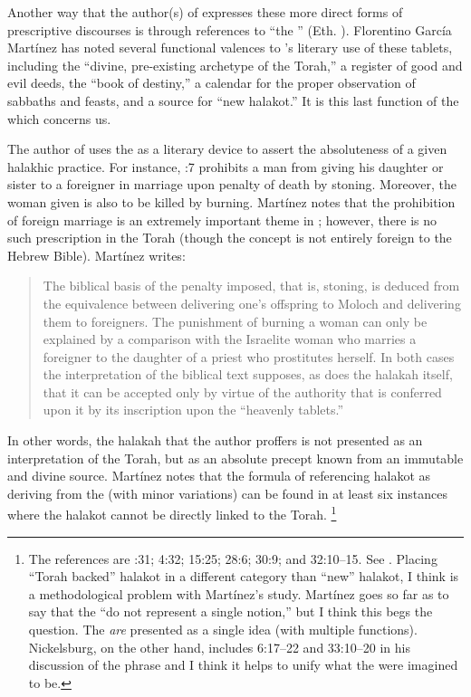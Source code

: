 Another way that the author(s) of \jub expresses these more direct forms of prescriptive discourses is through references to ``the \heavenlytablets'' (Eth. ). Florentino García Martínez has noted several functional valences to \jub's literary use of these tablets, including  the ``divine, pre-existing archetype of the Torah,'' a register of good and evil deeds, the ``book of destiny,'' a calendar for the proper observation of sabbaths and feasts, and a source for ``new halakot.''%
    \autocite{martinez_najman-tigchelaar2012}
It is this last function of the \heavenlytablets which concerns us.

The author of \jub uses the \heavenlytablets as a literary device to assert the absoluteness of a given halakhic practice. For instance, :7 prohibits a man from giving his daughter or sister to a foreigner in marriage upon penalty of death by stoning. Moreover, the woman given is also to be killed by burning. Martínez notes that the prohibition of foreign marriage is an extremely important theme in \jub; however, there is no such prescription in the Torah (though the concept is not entirely foreign to the Hebrew Bible). Martínez writes:
\begin{quote}
    The biblical basis of the penalty imposed, that is, stoning, is deduced from the equivalence between delivering one's offspring to Moloch and delivering them to foreigners. The punishment of burning a woman can only be explained by a comparison with the Israelite woman who marries a foreigner to the daughter of a priest who prostitutes herself. In both cases the interpretation of the biblical text supposes, as does the halakah itself, that it can be accepted only by virtue of the authority that is conferred upon it by its inscription upon the ``heavenly tablets.''\autocite[67]{martinez_najman-tigchelaar2012}
\end{quote}
\noindent
In other words, the halakah that the author proffers is not presented as an interpretation of the Torah, but as an absolute precept known from an immutable and divine source. Martínez notes that the formula of referencing halakot as deriving from the \heavenlytablets (with minor variations) can be found in at least six instances where the halakot cannot be directly linked to the Torah.%
    \footnote{%
        The references are :31; 4:32; 15:25; 28:6; 30:9; and 32:10--15. See 
        \cite[64--68]{martinez_najman-tigchelaar2012}. Placing ``Torah backed'' halakot in a different category than ``new'' halakot, I think is a methodological problem with Martínez's study. Martínez goes so far as to say that the \heavenlytablets ``do not represent a single notion,'' but I think this begs the question. The \heavenlytablets \emph{are} presented as a single idea (with multiple functions). Nickelsburg, on the other hand, includes 6:17--22 and 33:10--20 in his discussion of the phrase and I think it helps to unify what the \heavenlytablets were imagined to be.}

